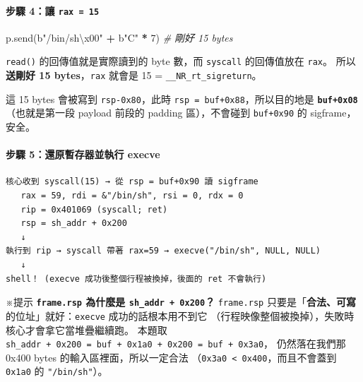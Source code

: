 \documentclass[10pt,a4paper]{article}
\newenvironment{Shaded}{\begin{snugshade}}{\end{snugshade}}
\newcommand{\CharTok}[1]{\textcolor[rgb]{0.31,0.60,0.02}{#1}}
\newcommand{\CommentTok}[1]{\textcolor[rgb]{0.56,0.35,0.01}{\textit{#1}}}
\newcommand{\DecValTok}[1]{\textcolor[rgb]{0.00,0.00,0.81}{#1}}
\newcommand{\NormalTok}[1]{#1}
\newcommand{\OperatorTok}[1]{\textcolor[rgb]{0.81,0.36,0.00}{\textbf{#1}}}
\newcommand{\StringTok}[1]{\textcolor[rgb]{0.31,0.60,0.02}{#1}}
\renewenvironment{Shaded}{%
  \def\FrameCommand{\fboxsep=3.2pt\colorbox{shadecolor}}%
  \MakeFramed{\advance\hsize-\width\FrameRestore\small}%
}{%
  \endMakeFramed
}
\renewenvironment{quote}{%
  \begin{mdframed}[linewidth=0pt,innerleftmargin=0pt,innerrightmargin=0pt,
    innerbottommargin=0pt,innertopmargin=0pt,skipabove=0.55em,skipbelow=0.55em,
    leftmargin=0.9em,rightmargin=0.4em,startcode={\color{quotebar}\vrule width 2.6pt},%
    endcode={}]%
  \itshape\color{black}%
}{%
  \end{mdframed}%
}
\begin{document}
\paragraph{\texorpdfstring{步驟 4：讓
\texttt{rax\ \allowbreak{}=\ \allowbreak{}15}}{步驟 4：讓 rax = 15}}\label{ux6b65ux9a5f-4ux8b93-rax-15}

\begin{Shaded}
\begin{Highlighting}[]
\NormalTok{p.send(}\StringTok{b"/bin/sh}\CharTok{\textbackslash{}x00}\StringTok{"} \OperatorTok{+} \StringTok{b"C"} \OperatorTok{*} \DecValTok{7}\NormalTok{)   }\CommentTok{\# 剛好 15 bytes}
\end{Highlighting}
\end{Shaded}

\texttt{read()} 的回傳值就是實際讀到的 byte 數，而 \texttt{syscall}
的回傳值放在 \texttt{rax}。 所以\textbf{送剛好 15 bytes}，\texttt{rax}
就會是 15 = \texttt{\_\allowbreak{}\_\allowbreak{}NR\_\allowbreak{}rt\_\allowbreak{}sigreturn}。

\begin{quote}
這 15 bytes 會被寫到 \texttt{rsp-\allowbreak{}0x80}，此時
\texttt{rsp\ \allowbreak{}=\ \allowbreak{}buf+0x88}，所以目的地是 \textbf{\texttt{buf+0x08}}
（也就是第一段 payload 前段的 padding 區），不會碰到 \texttt{buf+0x90}
的 sigframe，安全。
\end{quote}

\paragraph{步驟 5：還原暫存器並執行
execve}\label{ux6b65ux9a5f-5ux9084ux539fux66abux5b58ux5668ux4e26ux57f7ux884c-execve}

\begin{Verbatim}[breaklines=true,breakanywhere=true,breakautoindent=false,fontsize=\fontsize{7.0}{9.5}\selectfont]
核心收到 syscall(15) → 從 rsp = buf+0x90 讀 sigframe
   rax = 59, rdi = &"/bin/sh", rsi = 0, rdx = 0
   rip = 0x401069 (syscall; ret)
   rsp = sh_addr + 0x200
   ↓
執行到 rip → syscall 帶著 rax=59 → execve("/bin/sh", NULL, NULL)
   ↓
shell！ (execve 成功後整個行程被換掉，後面的 ret 不會執行)
\end{Verbatim}

\begin{quote}
※提示 \textbf{\texttt{frame.\allowbreak{}rsp} 為什麼是 \texttt{sh\_\allowbreak{}addr\ \allowbreak{}+\ \allowbreak{}0x200}？}
\texttt{frame.\allowbreak{}rsp}
只要是「\textbf{合法、可寫}的位址」就好：\texttt{execve}
成功的話根本用不到它
（行程映像整個被換掉），失敗時核心才會拿它當堆疊繼續跑。 本題取
\texttt{sh\_\allowbreak{}addr\ \allowbreak{}+\ \allowbreak{}0x200\ \allowbreak{}=\ \allowbreak{}buf\ \allowbreak{}+\ \allowbreak{}0x1a0\ \allowbreak{}+\ \allowbreak{}0x200\ \allowbreak{}=\ \allowbreak{}buf\ \allowbreak{}+\ \allowbreak{}0x3a0}，
仍然落在我們那 0x400 bytes 的輸入區裡面，所以一定合法
（\texttt{0x3a0\ \allowbreak{}\textless{}\allowbreak{}\ \allowbreak{}0x400}，而且不會蓋到 \texttt{0x1a0} 的
\texttt{"/\allowbreak{}bin/\allowbreak{}sh"}）。
\end{quote}
\end{document}
